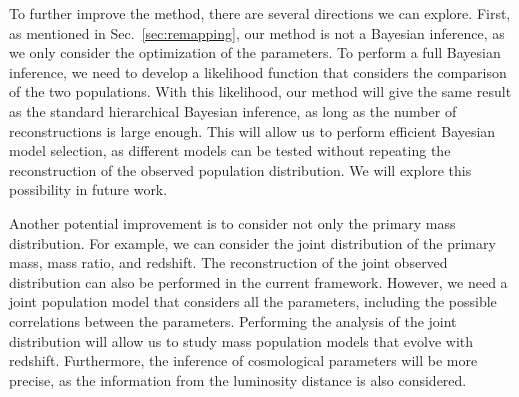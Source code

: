 \documentclass[sn-aps, pdflatex, iicol]{sn-jnl}
\begin{document}
To further improve the method, there are several directions we can explore.
First, as mentioned in Sec.~\ref{sec:remapping}, our method is not a Bayesian inference, as we only consider the optimization of the parameters.
To perform a full Bayesian inference, we need to develop a likelihood function that considers the comparison of the two populations.
With this likelihood, our method will give the same result as the standard hierarchical Bayesian inference, as long as the number of reconstructions is large enough.
This will allow us to perform efficient Bayesian model selection, as different models can be tested without repeating the reconstruction of the observed population distribution.
We will explore this possibility in future work.

Another potential improvement is to consider not only the primary mass distribution.
For example, we can consider the joint distribution of the primary mass, mass ratio, and redshift.
The reconstruction of the joint observed distribution can also be performed in the current framework.
However, we need a joint population model that considers all the parameters, including the possible correlations between the parameters.
Performing the analysis of the joint distribution will allow us to study mass population models that evolve with redshift.
Furthermore, the inference of cosmological parameters will be more precise, as the information from the luminosity distance is also considered.

\backmatter

\end{document}
